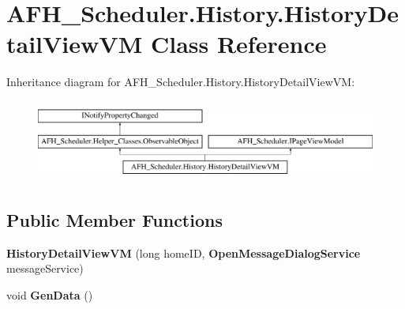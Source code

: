\section{A\+F\+H\+\_\+\+Scheduler.\+History.\+History\+Detail\+View\+VM Class Reference}
\label{class_a_f_h___scheduler_1_1_history_1_1_history_detail_view_v_m}
Inheritance diagram for A\+F\+H\+\_\+\+Scheduler.\+History.\+History\+Detail\+View\+VM\+:\begin{figure}[H]
\begin{center}
\leavevmode
\includegraphics[height=2.700965cm]{class_a_f_h___scheduler_1_1_history_1_1_history_detail_view_v_m}
\end{center}
\end{figure}
\subsection*{Public Member Functions}
\begin{DoxyCompactItemize}
\item 
\mbox{\label{class_a_f_h___scheduler_1_1_history_1_1_history_detail_view_v_m_ae4d3b2b5774dad13c7faa12a9c7bcb38}} 
{\bfseries History\+Detail\+View\+VM} (long home\+ID, \textbf{ Open\+Message\+Dialog\+Service} message\+Service)
\item 
\mbox{\label{class_a_f_h___scheduler_1_1_history_1_1_history_detail_view_v_m_a88bb0d58963a9a3f25e8c382e0c2405f}} 
void {\bfseries Gen\+Data} ()
\end{DoxyCompactItemize}
